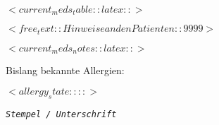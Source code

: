 \documentclass[
	version=last,
	paper=portrait,
	paper=a4,
	DIV=9,									%
	BCOR=0mm,								%
	fontsize=12pt,							%
	parskip=full,							%
	headsepline=on,
	footsepline=on,
	titlepage=false
]{scrartcl}
\begin{document}

$<current_meds_table::latex::>$


$<free_text::Hinweise an den Patienten::9999>$

$<current_meds_notes::latex::>$


\vfill{}

\noindent Bislang bekannte Allergien:

\noindent $<allergy_state::::>$

\noindent {}

\medskip{}

\noindent \begin{flushright}
\texttt{\textsl{\footnotesize Stempel / Unterschrift}}
\par\end{flushright}

\end{document}

